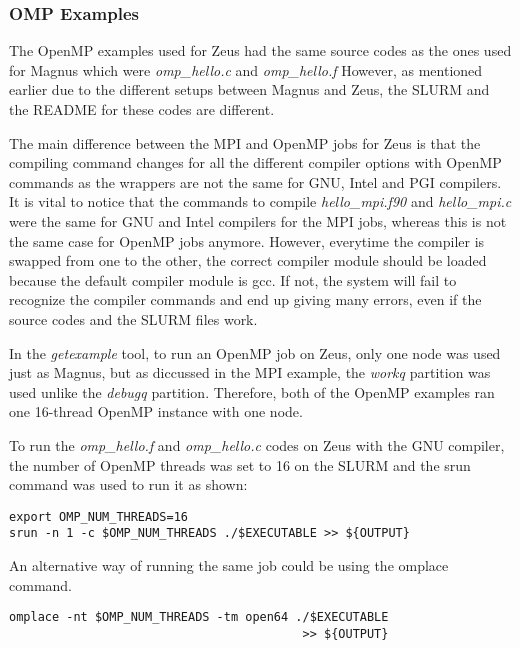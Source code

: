 \subsubsection{OMP Examples}

The OpenMP examples used for Zeus had the same source codes as the ones used for Magnus which were \emph{omp\_hello.c} and \emph{omp\_hello.f}
However, as mentioned earlier due to the different setups between Magnus and Zeus, the SLURM and the README for these codes are different.

The main difference between the MPI and OpenMP jobs for Zeus is that the compiling command changes for all the different compiler options with OpenMP
commands as the wrappers are not the same for GNU, Intel and PGI compilers. It is vital to notice that the commands to compile \emph{hello\_mpi.f90} and
\emph{hello\_mpi.c} were the same for GNU and Intel compilers for the MPI jobs, whereas this is not the same case for OpenMP jobs anymore. However, 
everytime the compiler is swapped from one to the other, the correct compiler module should be loaded because the default compiler module is gcc. If not, 
the system will fail to recognize the compiler commands and end up giving many errors, even if the source codes and the SLURM files work.

In the \emph{getexample} tool, to run an OpenMP job on Zeus, only one node was used just as Magnus, but as diccussed in the MPI example, the \emph{workq} 
partition was used unlike the \emph{debugq} partition. Therefore, both of the OpenMP examples ran one 16-thread OpenMP instance with one node.

To run the \emph{omp\_hello.f} and \emph{omp\_hello.c} codes on Zeus with the GNU compiler, the number of OpenMP threads was set to 16 on the SLURM and 
the srun command was used to run it as shown:

\begin{tcolorbox}
\begin{Verbatim}[fontsize=\scriptsize]
export OMP_NUM_THREADS=16
srun -n 1 -c $OMP_NUM_THREADS ./$EXECUTABLE >> ${OUTPUT}
\end{Verbatim}
\end{tcolorbox}

An alternative way of running the same job could be using the omplace command.

\begin{tcolorbox}
\begin{Verbatim}[fontsize=\scriptsize]
omplace -nt $OMP_NUM_THREADS -tm open64 ./$EXECUTABLE 
                                         >> ${OUTPUT}
\end{Verbatim}
\end{tcolorbox}

